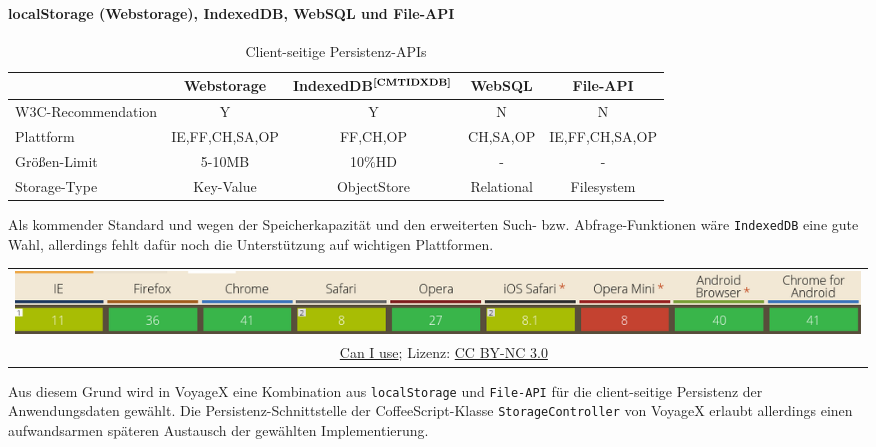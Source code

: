 \paragraph{localStorage (Webstorage), IndexedDB, WebSQL und File-API}
	\begin{table}[H]
		\centering
		\begin{tabulary}{\columnwidth}{|L|C|C|C|C|}
		\hline
			& \textbf{Webstorage} & \textbf{IndexedDB$^{\textbf{\ref{CMTIDXDB}}}$} & \textbf{WebSQL} & \textbf{File-API} \\ \hline
			W3C-Recommendation     & Y & Y & N & N \\ \hline
			Plattform     & IE,FF,CH,SA,OP & FF,CH,OP & CH,SA,OP & IE,FF,CH,SA,OP \\ \hline
			Größen-Limit     & 5-10MB & 10\%HD & - & - \\ \hline
			Storage-Type    & Key-Value & ObjectStore & Relational & Filesystem \\ \hline
		\end{tabulary}
		\caption{Client-seitige Persistenz-APIs}
	\end{table}
\addtocounter{footnote}{1}%
Als kommender Standard und wegen der Speicherkapazität und den erweiterten Such- bzw. Abfrage-Funktionen wäre \texttt{IndexedDB} eine gute Wahl, allerdings fehlt dafür noch die Unterstützung auf wichtigen Plattformen. 
	\begin{table}[H]
  		\begin{adjustwidth}{-1.5cm}{1.5cm}
		\centering
		\begin{tabulary}{20cm}{C}
	  		\includegraphics[scale=0.6]{bilder/screenshots/caniuse_indexeddb.png}\\
				\ccLogo\ 
				\begingroup
    				\fontsize{8pt}{12pt}\selectfont
    				\href{http://caniuse.com/\#search=IndexedDB}{Can I use}; Lizenz: \href{http://creativecommons.org/licenses/by-nc/3.0/}{CC BY-NC 3.0} 
				\endgroup
		\end{tabulary}
  		\end{adjustwidth}
	\end{table}
Aus diesem Grund wird in VoyageX eine Kombination aus \texttt{localStorage} und \texttt{File-API} für die client-seitige Persistenz der Anwendungsdaten gewählt. Die Persistenz-Schnittstelle der CoffeeScript-Klasse \texttt{StorageController} von VoyageX erlaubt allerdings einen aufwandsarmen späteren Austausch der gewählten Implementierung.

